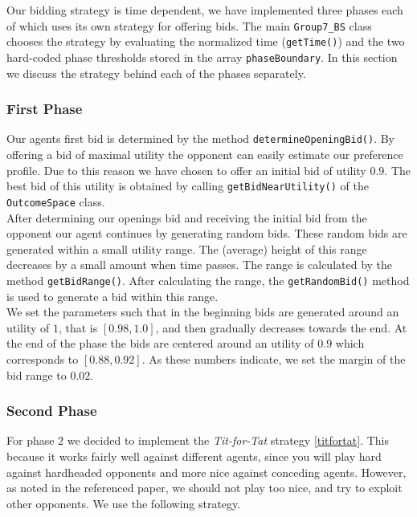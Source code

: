 Our bidding strategy is time dependent, we have implemented three phases each of which uses its own strategy for offering bids. The main \texttt{Group7\_BS} class chooses the strategy by evaluating the normalized time (\texttt{getTime()}) and the two hard-coded phase thresholds stored in the array \texttt{phaseBoundary}. In this section we discuss the strategy behind each of the phases separately.

\subsubsection{First Phase}
Our agents first bid is determined by the method \texttt{determineOpeningBid()}. By offering a bid of maximal utility the opponent can easily estimate our preference profile. Due to this reason we have chosen to offer an initial bid of utility $0.9$. The best bid of this utility is obtained by calling \texttt{getBidNearUtility()} of the \texttt{OutcomeSpace} class. \\

After determining our openings bid and receiving the initial bid from the opponent our agent continues by generating random bids. These random bids are generated within a small utility range. The (average) height of this range decreases by a small amount when time passes. The range is calculated by the method \texttt{getBidRange()}. After calculating the range, the \texttt{getRandomBid()} method is used to generate a bid within this range. \\

We set the parameters such that in the beginning bids are generated around an utility of $1$, that is $[0.98, 1.0]$, and then gradually decreases towards the end. At the end of the phase the bids are centered around an utility of $0.9$ which corresponds to $[0.88, 0.92]$. As these numbers indicate, we set the margin of the bid range to $0.02$. 

\subsubsection{Second Phase}

For phase $2$ we decided to implement the \emph{Tit-for-Tat} strategy \ref{titfortat}.
This because it works fairly well against different agents, since you will play
hard against hardheaded opponents and more nice against conceding agents.
However, as noted in the referenced paper, we should not play too nice,
and try to exploit other opponents. We use the following strategy. \\

